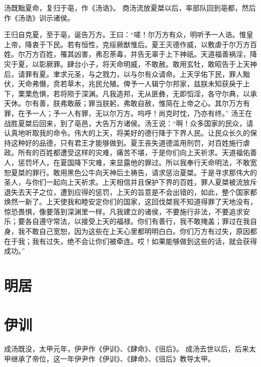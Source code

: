 \documentclass[a4paper,12pt,UTF8,twoside]{ctexbook}
\begin{document}
汤既黜夏命，复归于亳，作《汤诰》。
商汤流放夏桀以后，率部队回到亳都，然后作《汤诰》训示诸侯。

王归自克夏，至于亳，诞告万方。王曰：“嗟！尔万方有众，明听予一人诰。惟皇上帝，降衷于下民。若有恒性，克绥厥猷惟后。夏王灭德作威，以敷虐于尔万方百姓。尔万方百姓，罹其凶害，弗忍荼毒，并告无辜于上下神祇。天道福善祸淫，降灾于夏，以彰厥罪。肆台小子，将天命明威，不敢赦。敢用玄牡，敢昭告于上天神后，请罪有夏。聿求元圣，与之戮力，以与尔有众请命。上天孚佑下民，罪人黜伏，天命弗僭，贲若草木，兆民允殖。俾予一人辑宁尔邦家，兹朕未知获戾于上下，栗栗危惧，若将陨于深渊。凡我造邦，无从匪彝，无即慆淫，各守尔典，以承天休。尔有善，朕弗敢蔽；罪当朕躬，弗敢自赦，惟简在上帝之心。其尔万方有罪，在予一人；予一人有罪，无以尔万方。呜呼！尚克时忱，乃亦有终。”
汤王在战胜夏桀后回来，到了亳邑，大告万方诸侯。汤王说：“啊！众多国家的民众，请认真地听取我的命令。伟大的上天，将美好的德行降于下界人民。让民众长久的保持这种好的品德，只有君王才能够做到。夏王丧失道德滥用刑罚，对百姓施行虐政。所有的百姓都遭受这样的灾难，痛苦不堪，于是你们向上天祈求。天道福佑善人，惩罚坏人，在夏国降下灾难，来显露他的罪过。所以我奉行天命明法，不敢宽恕夏桀的罪行。敢用黑色公牛向天神后土祷告，请求惩治夏桀。于是寻求那伟大的圣人，与你们一起向上天祈求。上天相信并且保护下界的百姓，罪人夏桀被流放斥退失去天子之位，遭到应得的惩罚，上天的旨意是不会出错的，如此，整个国家都焕然一新了。上天使我和睦安定你们的国家，这回伐桀我不知道得罪了天地没有，惊恐畏惧，像要落到深渊里一样。凡我建立的诸侯，不要施行非法，不要追求安乐；要各自遵守常法，以接受上天的福禄。你们有善行，我不敢掩盖；罪过在我自身，我不敢自己宽恕，因为这些在上天心里都明明白白。你们万方有过失，原因都在于我；我有过失，绝不会让你们被牵连。哎！如果能够做到这些的话，就会获得成功。”
\chapter{明居}
\chapter{伊训}

成汤既没，太甲元年，伊尹作《伊训》、《肆命》、《徂后》。
成汤去世以后，后来太甲继承了帝位，这一年伊尹作《伊训》、《肆命》、《徂后》教导太甲。
\end{document}
